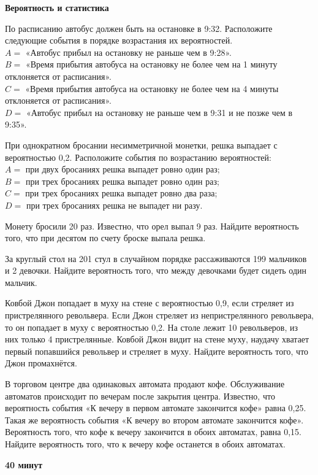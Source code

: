 \centerline{\bf \Huge Вероятность и статистика}

 По расписанию автобус должен быть на остановке в 9:32. Расположите следующие события в порядке возрастания их вероятностей.\\
$A=$ «Автобус прибыл на остановку не раньше чем в 9:28».\\
$B=$ «Время прибытия автобуса на остановку не более чем на 1 минуту отклоняется от расписания».\\
$C=$ «Время прибытия автобуса на остановку не более чем на 4 минуты отклоняется от расписания».\\
$D=$ «Автобус прибыл на остановку не раньше чем в 9:31 и не позже чем в 9:35».

 При однократном бросании несимметричной монетки, решка выпадает с вероятностью 0,2. Расположите события по возрастанию вероятностей:\\
$A=$ при двух бросаниях решка выпадет ровно один раз;\\
$B=$ при трех бросаниях решка выпадет ровно один раз;\\
$C=$ при трех бросаниях решка выпадет ровно два раза;\\
$D=$ при трех бросаниях решка не выпадет ни разу.

 Монету бросили 20 раз. Известно, что орел выпал 9 раз. Найдите вероятность того, что при десятом по счету броске выпала решка.

 За круглый стол на 201 стул в случайном порядке рассаживаются 199 мальчиков и 2 девочки. Найдите вероятность того, что между девочками будет сидеть один мальчик.

 Ковбой Джон попадает в муху на стене с вероятностью 0,9, если стреляет из пристрелянного револьвера. Если Джон стреляет из непристрелянного револьвера, то он попадает в муху с вероятностью 0,2. На столе лежит 10 револьверов, из них только 4 пристрелянные. Ковбой Джон видит на стене муху, наудачу хватает первый попавшийся револьвер и стреляет в муху. Найдите вероятность того, что Джон промахнётся.

 В торговом центре два одинаковых автомата продают кофе. Обслуживание автоматов происходит по вечерам после закрытия центра. Известно, что вероятность события «К вечеру в первом автомате закончится кофе» равна 0,25. Такая же вероятность события «К вечеру во втором автомате закончится кофе». Вероятность того, что кофе к вечеру закончится в обоих автоматах, равна 0,15. Найдите вероятность того, что к вечеру кофе останется в обоих автоматах.\\

\centerline{\textbf{40 минут}}